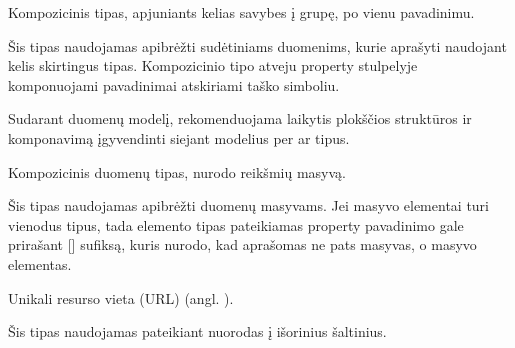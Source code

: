 \documentclass[letterpaper,10pt,lithuanian]{sphinxmanual}
\begin{document}

\begin{fulllineitems}
\label{\detokenize{tipai:type.object}}
\pysigstartsignatures
{}
\pysigstopsignatures
\sphinxAtStartPar
Kompozicinis tipas, apjuniants kelias savybes į grupę, po vienu pavadinimu.

\sphinxAtStartPar
Šis tipas naudojamas apibrėžti sudėtiniams duomenims, kurie aprašyti
naudojant kelis skirtingus tipas. Kompozicinio tipo atveju property
stulpelyje komponuojami pavadinimai atskiriami taško simboliu.

\sphinxAtStartPar
Sudarant duomenų modelį, rekomenduojama laikytis plokščios struktūros ir
komponavimą įgyvendinti siejant modelius per  ar  tipus.

\end{fulllineitems}


\begin{fulllineitems}
\label{\detokenize{tipai:type.array}}
\pysigstartsignatures
{}
\pysigstopsignatures
\sphinxAtStartPar
Kompozicinis duomenų tipas, nurodo reikšmių masyvą.

\sphinxAtStartPar
Šis tipas naudojamas apibrėžti duomenų masyvams. Jei masyvo elementai
turi vienodus tipus, tada elemento tipas pateikiamas property pavadinimo
gale prirašant {[}{]} sufiksą, kuris nurodo, kad aprašomas ne pats masyvas,
o masyvo elementas.

\end{fulllineitems}


\begin{fulllineitems}
\label{\detokenize{tipai:type.url}}
\pysigstartsignatures
{}
\pysigstopsignatures
\sphinxAtStartPar
Unikali resurso vieta (URL) (angl. ).

\sphinxAtStartPar
Šis tipas naudojamas pateikiant nuorodas į išorinius šaltinius.

\sphinxAtStartPar
{}

\end{fulllineitems}
\end{document}

